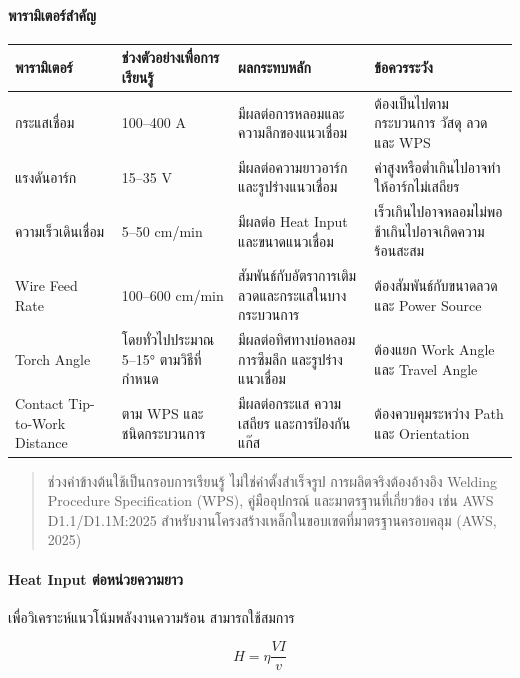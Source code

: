 \paragraph{พารามิเตอร์สำคัญ}

\begin{table}[htbp]
    \centering
    \small
    \begin{tabularx}{\textwidth}{L{0.18\textwidth} L{0.20\textwidth} Y Y}
        \hline
        \textbf{พารามิเตอร์} & \textbf{ช่วงตัวอย่างเพื่อการเรียนรู้} & \textbf{ผลกระทบหลัก} & \textbf{ข้อควรระวัง} \\
        \hline
        กระแสเชื่อม & 100–400 A & มีผลต่อการหลอมและความลึกของแนวเชื่อม & ต้องเป็นไปตามกระบวนการ วัสดุ ลวด และ WPS \\
        แรงดันอาร์ก & 15–35 V & มีผลต่อความยาวอาร์กและรูปร่างแนวเชื่อม & ค่าสูงหรือต่ำเกินไปอาจทำให้อาร์กไม่เสถียร \\
        ความเร็วเดินเชื่อม & 5–50 cm/min & มีผลต่อ Heat Input และขนาดแนวเชื่อม & เร็วเกินไปอาจหลอมไม่พอ ช้าเกินไปอาจเกิดความร้อนสะสม \\
        Wire Feed Rate & 100–600 cm/min & สัมพันธ์กับอัตราการเติมลวดและกระแสในบางกระบวนการ & ต้องสัมพันธ์กับขนาดลวดและ Power Source \\
        Torch Angle & โดยทั่วไปประมาณ 5–15° ตามวิธีที่กำหนด & มีผลต่อทิศทางบ่อหลอม การซึมลึก และรูปร่างแนวเชื่อม & ต้องแยก Work Angle และ Travel Angle \\
        Contact Tip-to-Work Distance & ตาม WPS และชนิดกระบวนการ & มีผลต่อกระแส ความเสถียร และการป้องกันแก๊ส & ต้องควบคุมระหว่าง Path และ Orientation \\
        \hline
    \end{tabularx}
\end{table}

\begin{quote}
ช่วงค่าข้างต้นใช้เป็นกรอบการเรียนรู้ ไม่ใช่ค่าตั้งสำเร็จรูป การผลิตจริงต้องอ้างอิง Welding Procedure Specification (WPS), คู่มืออุปกรณ์ และมาตรฐานที่เกี่ยวข้อง เช่น AWS D1.1/D1.1M:2025 สำหรับงานโครงสร้างเหล็กในขอบเขตที่มาตรฐานครอบคลุม (AWS, 2025)
\end{quote}

\paragraph{Heat Input ต่อหน่วยความยาว}

เพื่อวิเคราะห์แนวโน้มพลังงานความร้อน สามารถใช้สมการ

\[
H=\eta\frac{VI}{v}
\]

